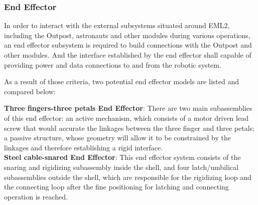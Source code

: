 \subsubsection{End Effector}
\label{sect:endeffectorto}
In order to interact with the external subsystems situated around EML2, including the Outpost, astronauts and other modules during various operations, an end effector subsystem is required to build connections with the Outpost and other modules. And the interface established by the end effector shall capable of providing power and data connections to and from the robotic system.

As a result of those criteria, two potential end effector models are listed and compared below:

\textbf{Three fingers-three petals End Effector}: There are two main subassemblies of this end effector: an active mechanism, which consists of a motor driven lead screw that would accurate the linkages between the three finger and three petals; a passive structure, whose geometry will allow it to be constrained by the linkages and therefore establishing a rigid interface.	\\
\textbf{Steel cable-snared End Effector}: This end effector system consists of the snaring and rigidizing subassembly inside the shell, and four latch/umbilical subassemblies outside the shell, which are responsible for the rigidizing loop and the connecting loop after the fine positioning for latching and connecting operation is reached.

